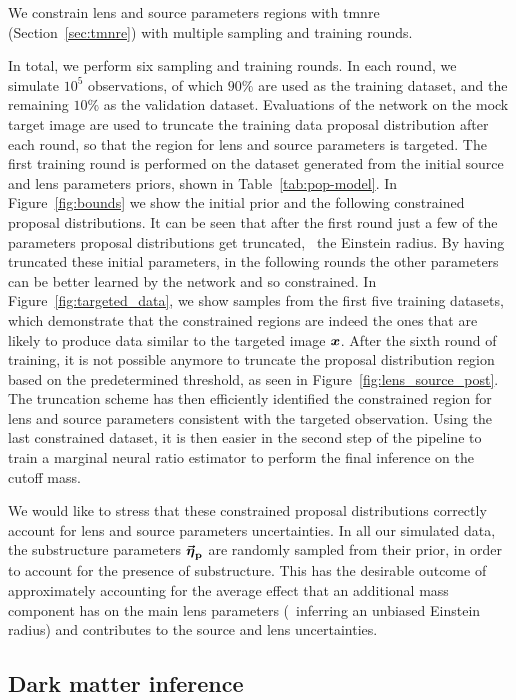 We constrain lens and source parameters regions with \gls*{tmnre} (Section~\ref{sec:tmnre}) with multiple sampling and training rounds.

In total, we perform six sampling and training rounds. In each round, we simulate $10^5$ observations, of which $90\%$ are used as the training dataset, and the remaining $10\%$ as the validation dataset. Evaluations of the network on the mock target image are used to truncate the training data proposal distribution after each round, so that the region for lens and source parameters is targeted. The first training round is performed on the dataset generated from the initial source and lens parameters priors, shown in Table~\ref{tab:pop-model}. In Figure~\ref{fig:bounds} we show the initial prior and the following constrained proposal distributions. It can be seen that after the first round just a few of the parameters proposal distributions get truncated, \eg~the Einstein radius. By having truncated these initial parameters, in the following rounds the other parameters can be better learned by the network and so constrained. In Figure~\ref{fig:targeted_data}, we show samples from the first five training datasets, which demonstrate that the constrained regions are indeed the ones that are likely to produce data similar to the targeted image $\bm{x}$. After the sixth round of training, it is not possible anymore to truncate the proposal distribution region based on the predetermined threshold, as seen in Figure~\ref{fig:lens_source_post}. The truncation scheme has then efficiently identified the constrained region for lens and source parameters consistent with the targeted observation. Using the last constrained dataset, it is then easier in the second step of the pipeline to train a marginal neural ratio estimator to perform the final inference on the cutoff mass.

We would like to stress that these constrained proposal distributions correctly account for lens and source parameters uncertainties. In all our simulated data, the substructure parameters $\boldsymbol{\vec{{\bm{\eta}}}_\mathrm{p}}$ are randomly sampled from their prior, in order to account for the presence of substructure. This has the desirable outcome of approximately accounting for the average effect that an additional mass component has on the main lens parameters (\eg\ inferring an unbiased Einstein radius) and contributes to the source and lens uncertainties.

\subsection{Dark matter inference}
\label{subsec:dm}

